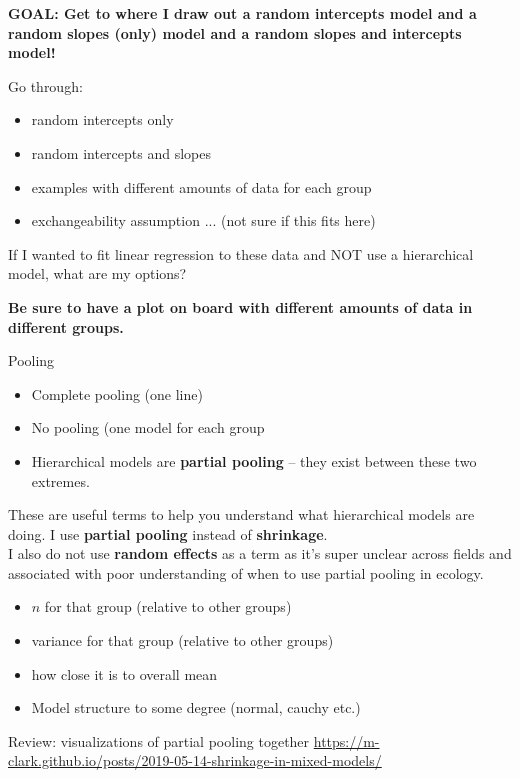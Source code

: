 \documentclass[11pt]{article}
\begin{document}
{\bf GOAL: Get to where I draw out a random intercepts model and a random slopes (only) model and a random slopes and intercepts model!}

Go through:
\begin{itemize}
\item random intercepts only
\item random intercepts and slopes
\item examples with different amounts of data for each group
\item exchangeability assumption ... (not sure if this fits here)
\end{itemize}

If I wanted to fit  linear regression to these data and NOT use a hierarchical model, what are my options?

{\bf Be sure to have a plot on board with different amounts of data in different groups.}

{\Large Pooling} %
\begin{itemize}
\item Complete pooling (one line)
\item No pooling (one model for each group
\item Hierarchical models are {\bf partial pooling} -- they exist between these two extremes. 
\end{itemize}

These are useful terms to help you understand what hierarchical models are doing. I use {\bf partial pooling} instead of {\bf shrinkage}. \\
I also do not use {\bf random effects} as a term as it's super unclear across fields and associated with poor understanding of when to use partial pooling in ecology.


\begin{itemize}
\item $n$ for that group (relative to other groups)
\item variance for that group (relative to other groups)
\item how close it is to overall mean 
\item Model structure to some degree (normal, cauchy etc.)
\end{itemize}

Review: visualizations of partial pooling together \url{https://m-clark.github.io/posts/2019-05-14-shrinkage-in-mixed-models/}
\end{document}
